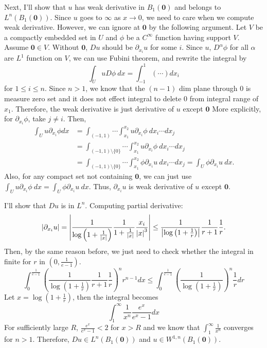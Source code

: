 \documentclass{article}
\begin{document}
Next, I'll show that $u$ has weak derivative in $B_1(\bm{0})$ and belongs to $L^n(B_1(\bm{0}))$. Since $u$ goes to $\infty $ as $x\rightarrow 0$, we need to care when we compute weak derivative. However, we can ignore at $\bm{0}$ by the following argument. Let $V$ be a compactly embedded set in $U$ and $\phi$ be a $C^\infty$ function having support $V$. Assume $\bm{0}\in V$. Without $\bm{0}$, $D u$ should be $\partial_{x_i}u$ for some $i$. Since $u$, $D^\alpha \phi$ for all $\alpha$ are $L^1$ function on $V$, we can use Fubini theorem, and rewrite the integral by
\begin{equation*}
\int_U uD \phi ~dx=\int_{-1}^1 (\cdots) dx_i
\end{equation*}
for $1\leq i \leq n$. Since $n>1$, we know that the $(n-1)$ dim plane through $0$ is measure zero set and it does not effect integral to delete $0$ from integral range of $x_1$. Therefore, the weak derivative is just derivative of $u$ except $\bm{0}$ More explicitly, for $\partial_{x_i}\phi$, take $j\neq i$. Then,
\begin{equation*}
\begin{split}
\int_U u\partial_{x_i}\phi dx&=\int_{(-1, 1)}\cdots \int_{x_1}^{x_2} u\partial_{x_i}\phi~ dx_i \cdots dx_j \\
&= \int_{(-1, 1)\setminus\{0\}}\cdots \int_{x_1}^{x_2} u\partial_{x_i}\phi ~dx_i \cdots dx_j\\
&= \int_{(-1, 1)\setminus\{0\}}\cdots \int_{x_1}^{x_2} \phi\partial_{x_i} u~ dx_i \cdots dx_j=\int_U \phi\partial_{x_i} u~dx.
\end{split}
\end{equation*}
Also, for any compact set not containing $\bm{0}$, we can just use $\int_U u\partial_{x_i}\phi~dx=\int_U \phi\partial_{x_i}u~dx$. Thus, $\partial_{x_i}u$ is weak derivative of $u$ except $\bm{0}$.

I'll show that $Du$ is in $L^n$. Computing partial derivative:
\begin{equation*}
\abs{\partial_{x_i} u}=\abs{\frac{1}{\log\left(1+\frac{1}{\abs{x}}\right)}\frac{1}{1+\frac{1}{\abs{x}}}\frac{x_i}{\abs{x}^3}}\leq  \frac{1}{\abs{\log\left(1+\frac{1}{r}\right)}}\frac{1}{r+1}\frac{1}{r}.
\end{equation*}
Then, by the same reason before, we just need to check whether the integral in finite for $r$ in $\left(0, \frac{1}{e-1}\right)$.
\begin{equation*}
\int_0^{\frac{1}{e-1}} \left(\frac{1}{\log\left(1+\frac{1}{r}\right)}\frac{1}{r+1}\frac{1}{r}\right)^n r^{n-1}dx \leq \int_0^{\frac{1}{e-1}} \left(\frac{1}{\log\left(1+\frac{1}{r}\right)}\right)^n \frac{1}{r}dr
\end{equation*}
Let $x=\log\left(1+\frac{1}{r}\right)$, then the integral becomes
\begin{equation*}
\int_1^\infty \frac{1}{x^n}\frac{e^x}{e^x-1}dx
\end{equation*}
For sufficiently large $R$, $\frac{e^x}{e^x-1}<2$ for $x>R$ and we know that $\int_1^\infty \frac{1}{x^n}$ converges for $n>1$. Therefore, $Du\in L^n(B_1(\bm{0}))$ and $u\in W^{1,n}(B_1(\bm{0}))$.
\end{document}
